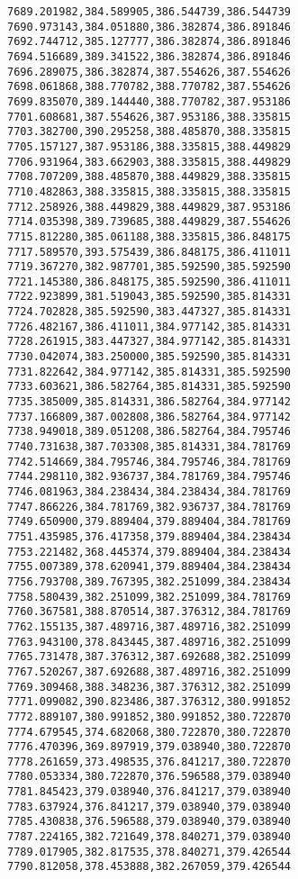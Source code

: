 \documentclass[11pt]{article}
\begin{document}
\begin{Verbatim}[commandchars=\\\{\}]
7689.201982,384.589905,386.544739,386.544739
7690.973143,384.051880,386.382874,386.891846
7692.744712,385.127777,386.382874,386.891846
7694.516689,389.341522,386.382874,386.891846
7696.289075,386.382874,387.554626,387.554626
7698.061868,388.770782,388.770782,387.554626
7699.835070,389.144440,388.770782,387.953186
7701.608681,387.554626,387.953186,388.335815
7703.382700,390.295258,388.485870,388.335815
7705.157127,387.953186,388.335815,388.449829
7706.931964,383.662903,388.335815,388.449829
7708.707209,388.485870,388.449829,388.335815
7710.482863,388.335815,388.335815,388.335815
7712.258926,388.449829,388.449829,387.953186
7714.035398,389.739685,388.449829,387.554626
7715.812280,385.061188,388.335815,386.848175
7717.589570,393.575439,386.848175,386.411011
7719.367270,382.987701,385.592590,385.592590
7721.145380,386.848175,385.592590,386.411011
7722.923899,381.519043,385.592590,385.814331
7724.702828,385.592590,383.447327,385.814331
7726.482167,386.411011,384.977142,385.814331
7728.261915,383.447327,384.977142,385.814331
7730.042074,383.250000,385.592590,385.814331
7731.822642,384.977142,385.814331,385.592590
7733.603621,386.582764,385.814331,385.592590
7735.385009,385.814331,386.582764,384.977142
7737.166809,387.002808,386.582764,384.977142
7738.949018,389.051208,386.582764,384.795746
7740.731638,387.703308,385.814331,384.781769
7742.514669,384.795746,384.795746,384.781769
7744.298110,382.936737,384.781769,384.795746
7746.081963,384.238434,384.238434,384.781769
7747.866226,384.781769,382.936737,384.781769
7749.650900,379.889404,379.889404,384.781769
7751.435985,376.417358,379.889404,384.238434
7753.221482,368.445374,379.889404,384.238434
7755.007389,378.620941,379.889404,384.238434
7756.793708,389.767395,382.251099,384.238434
7758.580439,382.251099,382.251099,384.781769
7760.367581,388.870514,387.376312,384.781769
7762.155135,387.489716,387.489716,382.251099
7763.943100,378.843445,387.489716,382.251099
7765.731478,387.376312,387.692688,382.251099
7767.520267,387.692688,387.489716,382.251099
7769.309468,388.348236,387.376312,382.251099
7771.099082,390.823486,387.376312,380.991852
7772.889107,380.991852,380.991852,380.722870
7774.679545,374.682068,380.722870,380.722870
7776.470396,369.897919,379.038940,380.722870
7778.261659,373.498535,376.841217,380.722870
7780.053334,380.722870,376.596588,379.038940
7781.845423,379.038940,376.841217,379.038940
7783.637924,376.841217,379.038940,379.038940
7785.430838,376.596588,379.038940,379.038940
7787.224165,382.721649,378.840271,379.038940
7789.017905,382.817535,378.840271,379.426544
7790.812058,378.453888,382.267059,379.426544

\end{Verbatim}
\end{document}

